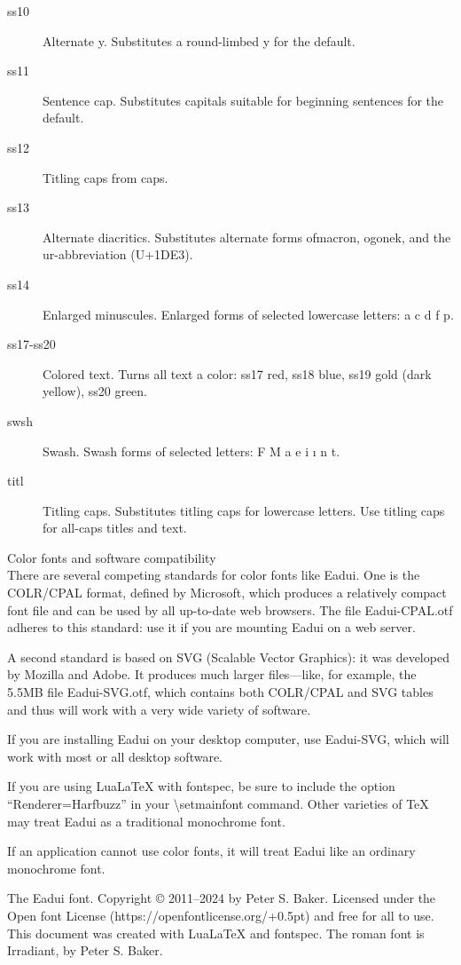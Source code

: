 \documentclass[11pt,letterpaper,twoside,openany]{book}
\begin{document}
{\begin{description}
  \item[\irsc ss10] Alternate y. Substitutes a round-limbed y for the default.

  \item[\irsc ss11] Sentence cap. Substitutes capitals suitable for beginning sentences
  for the default.

  \item[\irsc ss12] Titling caps from caps.

  \item[\irsc ss13] Alternate diacritics. Substitutes alternate forms of\linebreak macron,
  ogonek, and the ur-abbreviation (U+1DE3).

  \item[\irsc ss14] Enlarged minuscules. Enlarged forms of selected lowercase letters:
  {\irit a c d f p}.

  \item[\irsc ss17-ss20] Colored text. Turns all text a color: ss17 red, ss18 blue,
  ss19 gold (dark yellow), ss20 green.

  \item[\irsc swsh] Swash. Swash forms of selected letters: {\irit F M a e i ı n t}.

  \item[\irsc titl] Titling caps. Substitutes titling caps for lowercase letters.
  Use titling caps for all-caps titles and text.

\end{description}
}

\newpage

\noindent Color fonts and software compatibility\\[1ex]

\noindent\normalsize\irrm There are several competing standards for color fonts like Eadui. One is
the COLR/CPAL format, defined by Microsoft, which produces a relatively compact font file
and can be used by all up-to-date web browsers. The file Eadui-CPAL.otf adheres to this
standard: use it if you are mounting Eadui on a web server.

A second standard is based on SVG (Scalable Vector Graphics): it was developed by
Mozilla and Adobe. It produces much larger files---like, for example, the 5.5MB file
Eadui-SVG.otf, which contains both COLR/CPAL and SVG tables and thus will work with
a very wide variety of software.

If you are installing Eadui on your desktop computer, use Eadui-SVG, which will work with
most or all desktop software.

If you are using {Lua\LaTeX} with fontspec, be sure to include the option “Renderer=Harfbuzz” in your
\textbackslash setmainfont command. Other varieties of {\TeX} may treat Eadui as a traditional
monochrome font.

If an application cannot use color fonts, it will treat Eadui like an ordinary monochrome font.
\vfill

\noindent\irit The Eadui font. Copyright © 2011--2024 by Peter S. Baker. Licensed under the Open font
License (https://openfontlicense.org/\kern+0.5pt) and free for all to use. This document was
created with {Lua\LaTeX} and fontspec. The roman font is Irradiant, by Peter S. Baker.
\end{document}
